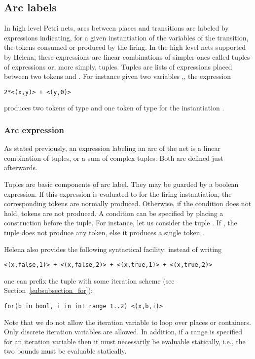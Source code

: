 \subsection{Arc labels}
\label{subsection_labels}
In high level Petri nets, arcs between places and transitions are
labeled by expressions indicating, for a given instantiation of the
variables of the transition, the tokens consumed or produced by the
firing.  In the high level nets supported by Helena, these expressions
are linear combinations of simpler ones called tuples of expressions
or, more simply, tuples.  Tuples are lists of expressions placed
between two tokens \LS{<(} and \LS{)>}.  For instance given two
variables ,, the expression
\begin{lstlisting}
2*<(x,y)> + <(y,0)>
\end{lstlisting}
produces two tokens of type  and one token of type
 for the instantiation .


\subsubsection{Arc expression}
As stated previously, an expression labeling an arc of the net is a
linear combination of tuples, or a sum of complex tuples.  Both are
defined just afterwards.\\

\arclabeldef


Tuples are basic components of arc label.  They may be guarded by a
boolean expression.  If this expression is evaluated to  for
the firing instantiation, the corresponding tokens are normally
produced.  Otherwise, if the condition does not hold, tokens are not
produced.  A condition can be specified by placing a construction
 before the tuple.  For instance, let us consider the
tuple .  If , the tuple does not
produce any token, else it produces a single token .

Helena also provides the following syntactical facility: instead of writing
\begin{lstlisting}
<(x,false,1)> + <(x,false,2)> + <(x,true,1)> + <(x,true,2)>
\end{lstlisting}
one can prefix the tuple with some iteration scheme (see
Section~\ref{subsubsection_for}):
\begin{lstlisting}
for(b in bool, i in int range 1..2) <(x,b,i)>
\end{lstlisting}
Note that we do not allow the iteration variable to loop over places
or containers.  Only discrete iteration variables are allowed.  In
addition, if a range is specified for an iteration variable then it
must necessarily be evaluable statically, i.e., the two bounds must be
evaluable statically.

